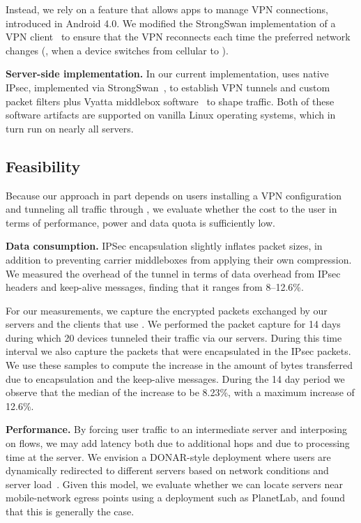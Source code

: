 Instead, we rely on a feature that allows apps to manage VPN connections, 
introduced in Android 4.0. We modified the StrongSwan implementation of 
a VPN client~\cite{strongswanclient} to ensure that the VPN reconnects each time the preferred 
network changes (\eg, when a device switches from cellular to \wifi). 

\noindent\textbf{Server-side implementation.} In our current implementation, \meddle 
uses native IPsec, implemented via StrongSwan~\cite{strongswan}, to establish VPN tunnels 
and custom packet filters plus Vyatta middlebox software~\cite{vyatta} to shape
traffic. Both of these software artifacts are supported on vanilla
Linux operating systems, which in turn run on nearly all servers. 
   
\subsection{Feasibility}
\label{subsec:cost}
Because our approach in part depends on users installing a VPN configuration and tunneling all traffic through \meddle, we evaluate whether the cost to the user in terms of performance, power and data quota is sufficiently low.
  
\noindent\textbf{Data consumption.} IPSec encapsulation slightly inflates packet sizes, in addition to 
preventing carrier middleboxes from applying their own compression. We measured the overhead 
of the tunnel in terms of data overhead from IPsec headers and keep-alive messages, finding that it 
ranges from 8--12.6\%. 

For our measurements, we capture the encrypted packets exchanged by 
our \meddle servers and the clients that use \meddle. We performed the packet capture for 14 days 
during which 20 devices tunneled their traffic via our \meddle servers. During this time interval we 
also capture the packets that were encapsulated in the IPsec packets. We use these samples to 
compute the increase in the amount of bytes transferred due to encapsulation and the keep-alive 
messages. During the 14 day period we observe that the median of the increase to be 8.23\%, 
with a maximum increase of 12.6\%.

\noindent\textbf{Performance.} By forcing user traffic to an
intermediate server and interposing on flows, we may add latency both
due to additional hops and due to processing time at the \meddle
server. We envision a DONAR-style deployment where users are
dynamically redirected to different \meddle servers based on network
conditions and server load~\cite{wendell:donar}. Given this model, we
evaluate whether we can locate servers near mobile-network egress
points using a deployment such as PlanetLab, and found that this is
generally the case.


